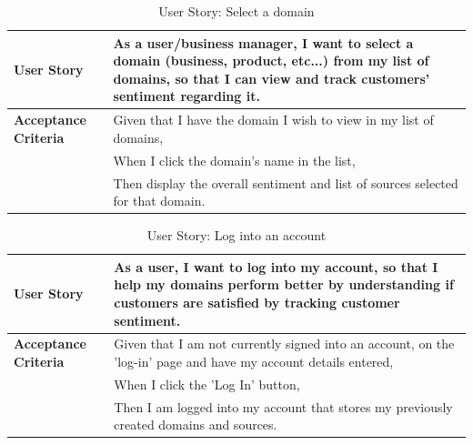 \documentclass[12pt]{article}
\begin{document}
\begin{table}[htbp]
  \caption{User Story: Select a domain}
  \begin{tabular}{|p{}|p{}|}
    \hline
    \textbf{User Story}          & As a user/business manager, I want to select a domain (business, product, etc...) from my list of domains, so that I can view and track customers' sentiment regarding it. \\
    \hline
    \textbf{Acceptance Criteria} &
    Given that I have the domain I wish to view in my list of domains,                                                                                                                                        \\
                                 & When I click the domain's name in the list,                                                                                                                                \\
                                 & Then display the overall sentiment and list of sources selected for that domain.                                                                                           \\
    \hline
  \end{tabular}
\end{table}

\begin{table}[htbp]
  \caption{User Story: Log into an account}
  \begin{tabular}{|p{}|p{}|}
    \hline
    \textbf{User Story}          & As a user, I want to log into my account, so that I help my domains perform better by understanding if customers are satisfied by tracking customer sentiment. \\
    \hline
    \textbf{Acceptance Criteria} &
    Given that I am not currently signed into an account, on the 'log-in' page and have my account details entered,                                                                               \\
                                 & When I click the 'Log In' button,                                                                                                                              \\
                                 & Then I am logged into my account that stores my previously created domains and sources.                                                                        \\
    \hline
  \end{tabular}
\end{table}
\end{document}
